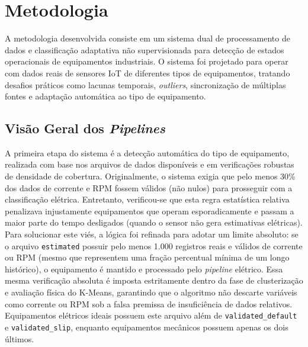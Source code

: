 \newpage
\chapter{Metodologia}
\label{chap:metodologia}

A metodologia desenvolvida consiste em um sistema dual de processamento de dados e classificação adaptativa não supervisionada para detecção de estados operacionais de equipamentos industriais. O sistema foi projetado para operar com dados reais de sensores IoT de diferentes tipos de equipamentos, tratando desafios práticos como lacunas temporais, \textit{outliers}, sincronização de múltiplas fontes e adaptação automática ao tipo de equipamento.

\section{Visão Geral dos \textit{Pipelines}}

A primeira etapa do sistema é a detecção automática do tipo de equipamento, realizada com base nos arquivos de dados disponíveis e em verificações robustas de densidade de cobertura. Originalmente, o sistema exigia que pelo menos 30\% dos dados de corrente e RPM fossem válidos (não nulos) para prosseguir com a classificação elétrica. Entretanto, verificou-se que esta regra estatística relativa penalizava injustamente equipamentos que operam esporadicamente e passam a maior parte do tempo desligados (quando o sensor não gera estimativas elétricas). Para solucionar este viés, a lógica foi refinada para adotar um limite absoluto: se o arquivo \texttt{estimated} possuir pelo menos 1.000 registros reais e válidos de corrente ou RPM (mesmo que representem uma fração percentual mínima de um longo histórico), o equipamento é mantido e processado pelo \textit{pipeline} elétrico. Essa mesma verificação absoluta é imposta estritamente dentro da fase de clusterização e avaliação física do K-Means, garantindo que o algoritmo não descarte variáveis como corrente ou RPM sob a falsa premissa de insuficiência de dados relativos. Equipamentos elétricos ideais possuem este arquivo além de \texttt{validated\_default} e \texttt{validated\_slip}, enquanto equipamentos mecânicos possuem apenas os dois últimos.

